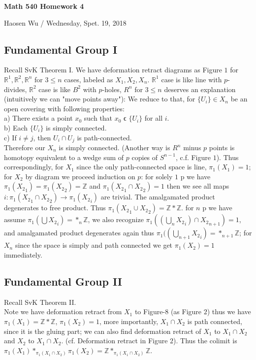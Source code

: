 \documentclass[11pt]{article}
\def\Z{{\mathbb Z}}
\def\R{{\mathbb R}}
\theoremstyle{remark}
\begin{document}
\begin{center}
    \begin{Large} {\bf Math 540 Homework 4}\\
    \end{Large}
    Haosen Wu  / Wednesday, Spet. 19, 2018
\end{center}

\subsection*{Fundamental Group I}
  Recall SvK Theorem I. We have deformation retract diagrams as Figure $1$ for $\R^1,\R^2,\R^n$ for $3\leq n$ cases, labeled as $X_1,X_2,X_n$. $\R^1$ case is like line with $p$-divides, $\R^2$ case is like $B^2$ with $p$-holes, $R^n$ for $3\leq n$ deserves an explanation (intuitively we can "move points away"): 
    We reduce to that, for $\{U_i\} \in X_n$ be an open covering with following properties:\\
    \indent a) There exists a point $x_0$ such that $x_0$ ϵ $\{U_i\}$ for all $i$.\\
    \indent b) Each $\{U_i\}$ is simply connected.\\
    \indent c) If $i\neq j$, then $U_i \cap U_j$ is path-connected.\\
    Therefore our $X_n$ is simply connected. 
  (Another way is $R^n$  minus $p$ points is homotopy equivalent to a wedge sum of $p$ copies of $S^{n−1}$, c.f. Figure $1$). Thus correspondingly, for $X_1$ since the only path-connected space is line, $\pi_1(X_1)=1$;  for $X_2$ by diagram we proceed induction on $p$: for solely $1$ p we have $\pi_1({X_2}_1)=\pi_1({X_2}_2)=\Z$ and $\pi_1({X_2}_1\cap {X_2}_2)=1$ then we see all maps $i:\pi_1({X_2}_1\cap {X_2}_2) \rightarrow \pi_1({X_2}_i)$ are trivial. The amalgamated product degenerates to free product. Thus $\pi_1({X_2}_1\cup {X_2}_2)=\Z*\Z$. for $n$ p we have assume $\pi_1(\bigcup {X_2}_i)=*_n\Z$, we also recognize  $\pi_1((\bigcup_n {X_2}_i)\cap {X_2}_{n+1})=1$, and amalgamated product degenerates again thus $\pi_1((\bigcup_{n+1} {X_2}_i)=*_{n+1}\Z$; for $X_n$ since the space is simply and path connected we get $\pi_1(X_{2})=1$ immediately. 
  
\subsection*{Fundamental Group II}
  Recall SvK Theorem II.\\
  Note we have deformation retract from $X_1$ to Figure-$8$ (as Figure $2$) thus we have $\pi_1(X_1)=\Z*\Z$, $\pi_1(X_2)=1$, more importantly, $X_1\cap X_2$ is path connected, since it is the gluing part; we can also find deformation retract of $X_1$ to $X_1\cap X_2$ and $X_2$ to $X_1\cap X_2$.  (cf. Deformation retract in Figure $2$). Thus the colimit is $\pi_1(X_1)*_{\pi_1(X_1\cap X_2)}\pi_1(X_2)=\Z*_{\pi_1(X_1\cap X_2)}\Z$. 
  
\end{document}
